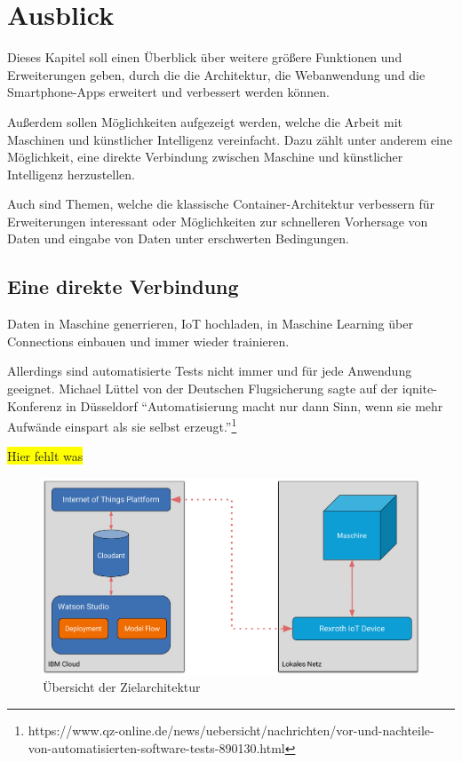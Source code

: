 \chapter{Ausblick}
\label{ch:ausblick}
Dieses Kapitel soll einen Überblick über weitere größere Funktionen und Erweiterungen geben, durch die die Architektur,
die Webanwendung und die Smartphone-Apps erweitert und verbessert werden können.

Außerdem sollen Möglichkeiten aufgezeigt werden, welche die Arbeit mit Maschinen und künstlicher Intelligenz vereinfacht.
Dazu zählt unter anderem eine Möglichkeit, eine direkte Verbindung zwischen Maschine und künstlicher Intelligenz 
herzustellen.

Auch sind Themen, welche die klassische Container-Architektur verbessern für Erweiterungen interessant oder Möglichkeiten
zur schnelleren Vorhersage von Daten und eingabe von Daten unter erschwerten Bedingungen.

\section{Eine direkte Verbindung}
Daten in Maschine generrieren, IoT hochladen, in Maschine Learning über Connections einbauen und immer wieder
trainieren.

Allerdings sind automatisierte Tests nicht immer und für jede Anwendung geeignet. Michael Lüttel von der Deutschen 
Flugsicherung sagte auf der iqnite-Konferenz in Düsseldorf \enquote{Automatisierung macht nur dann Sinn, wenn sie mehr 
Aufwände einspart als sie selbst erzeugt.}\footnote{https://www.qz-online.de/news/uebersicht/nachrichten/vor-und-nachteile-von-automatisierten-software-tests-890130.html}

\colorbox{yellow}{Hier fehlt was}

\begin{figure}[h]
    \centering
    \includegraphics[width=\textwidth]{images/kapitel_6/architektur_uebersicht.pdf}
    \caption{Übersicht der Zielarchitektur}
    \label{fig:ausblick_uebersicht}
\end{figure}

